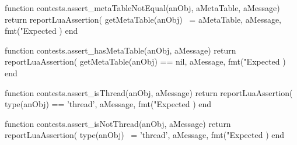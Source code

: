 \stopTestSuite


\startLuaCode
function contests.assert_metaTableNotEqual(anObj, aMetaTable, aMessage)
  return reportLuaAssertion(
    getMetaTable(anObj) ~= aMetaTable,
    aMessage,
    fmt("Expected %
  )
end
\stopLuaCode

\stopTestSuite


\startLuaCode
function contests.assert_hasMetaTable(anObj, aMessage)
  return reportLuaAssertion(
    getMetaTable(anObj) == nil,
    aMessage,
    fmt("Expected %
  )
end
\stopLuaCode

\stopTestSuite


\startLuaCode
function contests.assert_isThread(anObj, aMessage)
  return reportLuaAssertion(
    type(anObj) == 'thread',
    aMessage,
    fmt("Expected %
  )
end
\stopLuaCode

\stopTestSuite


\startLuaCode
function contests.assert_isNotThread(anObj, aMessage)
  return reportLuaAssertion(
    type(anObj) ~= 'thread',
    aMessage,
    fmt("Expected %
  )
end
\stopLuaCode

\stopTestSuite

\stopchapter